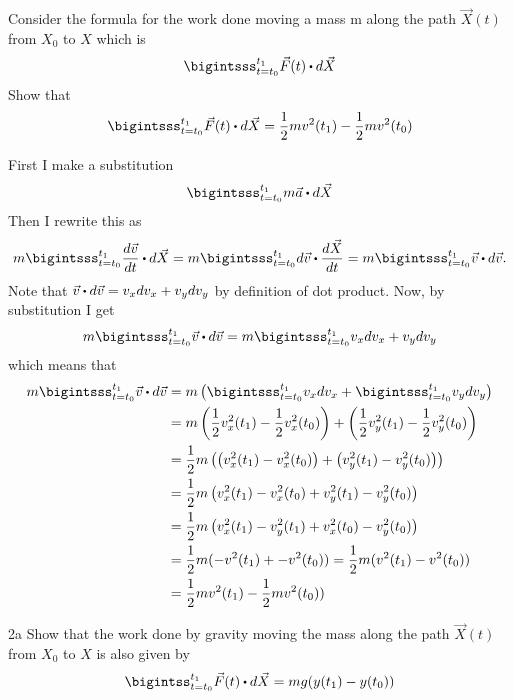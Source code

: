 \documentclass[titlepage]{article}
\begin{document}
\fancyhf{}
\cfoot{\thepage}

\begin{problem}{1}
Consider the formula for the work done moving a mass m along the path $\vec{X}(t)$ from $X_0$ to $X$ which is
$$ \bigintsss_{t=t_0}^{t_1} \vec{F}(t) \bigcdot d\vec{X}$$
Show that
$$ \bigintsss_{t=t_0}^{t_1} \vec{F}(t) \bigcdot d\vec{X} = \frac{1}{2}mv^2(t_1) - \frac{1}{2}mv^2(t_0)$$
\end{problem}

\begin{solution}
First I make a substitution
$$ \bigintsss_{t=t_0}^{t_1} m\vec{a} \bigcdot d\vec{X}$$
Then I rewrite this as
$$ m\bigintsss_{t=t_0}^{t_1} \frac{d\vec{v}}{dt} \bigcdot d\vec{X} = m\bigintsss_{t=t_0}^{t_1} d\vec{v} \bigcdot \frac{d\vec{X}}{dt} = m\bigintsss_{t=t_0}^{t_1} \vec{v}\bigcdot d\vec{v}.$$
Note that $\vec{v}\bigcdot d\vec{v} = v_xdv_x + v_ydv_y$ by definition of dot product. Now, by substitution I get
$$m\bigintsss_{t=t_0}^{t_1} \vec{v}\bigcdot d\vec{v} = m\bigintsss_{t=t_0}^{t_1} v_xdv_x + v_ydv_y$$
which means that
\begin{align*}
m\bigintsss_{t=t_0}^{t_1} \vec{v}\bigcdot d\vec{v} &= m\left(\bigintsss_{t=t_0}^{t_1} v_xdv_x + \bigintsss_{t=t_0}^{t_1} v_ydv_y\right) \\
&= m \left(\frac{1}{2}v_x^2(t_1) - \frac{1}{2}v_x^2(t_0)\right) + \left(\frac{1}{2}v_y^2(t_1) - \frac{1}{2}v_y^2(t_0)\right) \\
&= \frac{1}{2}m\left(\left(v_x^2(t_1) -v_x^2(t_0)\right) + \left(v_y^2(t_1) - v_y^2(t_0)\right)\right) \\
&= \frac{1}{2}m\left(v_x^2(t_1) -v_x^2(t_0) + v_y^2(t_1) - v_y^2(t_0)\right) \\
&= \frac{1}{2}m\left(v_x^2(t_1) -v_y^2(t_1) + v_x^2(t_0) - v_y^2(t_0)\right) \\ 
&= \frac{1}{2}m(-v^2(t_1) + -v^2(t_0)) = \frac{1}{2}m(v^2(t_1) - v^2(t_0)) \\ 
&= \frac{1}{2}m v^2(t_1) - \frac{1}{2}mv^2(t_0))
\end{align*}
\end{solution}

\begin{problem}{2a}
Show that the work done by gravity moving the mass along the path $\vec{X}(t)$ from $X_0$ to $X$ is also given by 
$$\bigintss_{t=t_0}^{t_1} \vec{F}(t) \bigcdot d\vec{X} = mg(y(t_1)-y(t_0))$$ 
\end{problem}
\end{document}
